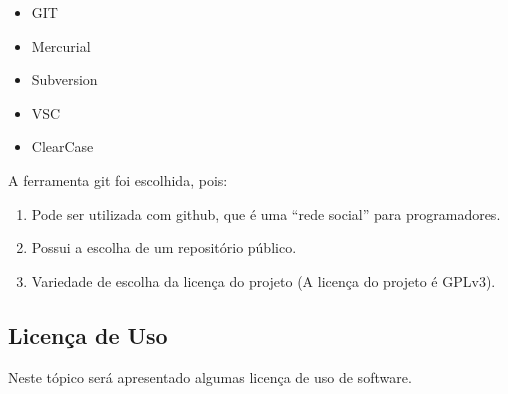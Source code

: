 \documentclass[12pt,a4paper]{article}
\begin{document}
\begin{itemize}
	\item GIT
	\item Mercurial
	\item Subversion
	\item VSC
	\item ClearCase
\end{itemize}

A ferramenta git foi escolhida, pois:

\begin{enumerate}
	\item Pode ser utilizada com github, que é uma “rede social” para programadores.
	\item Possui a escolha de um repositório público.
	\item Variedade de escolha da licença do projeto (A licença do projeto é GPLv3).
\end{enumerate}

\subsection {Licença de Uso}
Neste tópico será apresentado algumas licença de uso de software.
\end{document}
